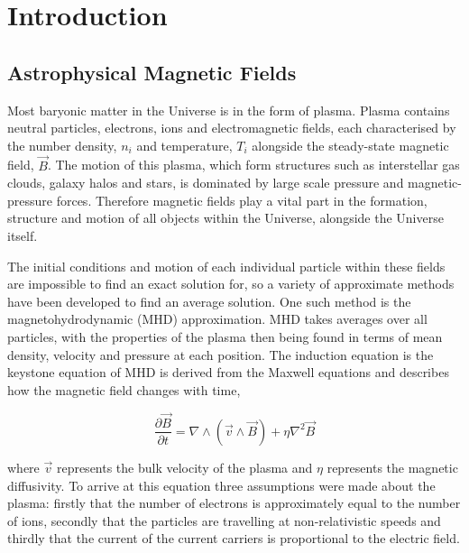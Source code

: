 \chapter{Introduction}
\label{chapt: Introduction}

\section{Astrophysical Magnetic Fields}
\label{sec: intro}



Most baryonic matter in the Universe is in the form of plasma. Plasma contains neutral particles, electrons, ions and electromagnetic fields, each characterised by the number density, $n_i$ and temperature, $T_i$ alongside the steady-state magnetic field, $\overset{\rightarrow}{B}$. The motion of this plasma, which form structures such as interstellar gas clouds, galaxy halos and stars, is dominated by large scale pressure and magnetic-pressure forces. Therefore magnetic fields play a vital part in the formation, structure and motion of all objects within the Universe, alongside the Universe itself.

The initial conditions and motion of each individual particle within these fields are impossible to find an exact solution for, so a variety of approximate methods have been developed to find an average solution. One such method is the magnetohydrodynamic (MHD) approximation. MHD takes averages over all particles, with the properties of the plasma then being found in terms of mean density, velocity and pressure at each position. The induction equation is the keystone equation of MHD is derived from the Maxwell equations and describes how the magnetic field changes with time, 

\begin{equation}
    \frac{\partial\Vec{B}}{\partial t} = \nabla \wedge (\Vec{v}\wedge\Vec{B})+\eta\nabla^2\Vec{B}
    \label{eq: induction}
\end{equation}

 where $\Vec{v}$ represents the bulk velocity of the plasma and $\eta$ represents the magnetic diffusivity. To arrive at this equation three assumptions were made about the plasma: firstly that the number of electrons is approximately equal to the number of ions, secondly that the particles are travelling at non-relativistic speeds and thirdly that the current of the current carriers is proportional to the electric field.

